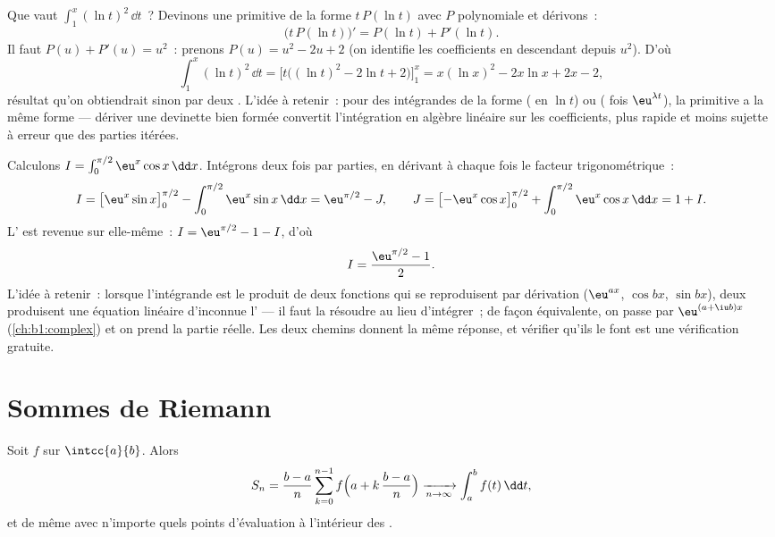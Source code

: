 \begin{example}\label{ex:b1:integration:guessdiff}
Que vaut $\int_1^x (\ln t)^2\,\dd t$~? Devinons une primitive de
la forme $t\,P(\ln t)$ avec $P$ polynomiale et dérivons~:
\[
\bigl(t\,P(\ln t)\bigr)' = P(\ln t) + P'(\ln t) .
\]
Il faut $P(u) + P'(u) = u^2$~: prenons $P(u) = u^2 - 2u + 2$ (on
identifie les coefficients en descendant depuis $u^2$). D'où
\[
\int_1^x (\ln t)^2\,\dd t
= \bigl[t\bigl((\ln t)^2 - 2\ln t + 2\bigr)\bigr]_1^x
= x(\ln x)^2 - 2x\ln x + 2x - 2 ,
\]
résultat qu'on obtiendrait sinon par deux . L'idée à retenir~: pour des intégrandes de la forme
( en $\ln t$) ou ( fois $\eu^{\lambda t}$), la
primitive a la même forme --- dériver une devinette bien formée
convertit l'intégration en algèbre linéaire sur les coefficients,
plus rapide et moins sujette à erreur que des parties itérées.
\end{example}

\begin{example}\label{ex:b1:integration:boomerang}
Calculons $I = \int_0^{\pi/2} \eu^x \cos x\,\dd x$. Intégrons deux
fois par parties, en dérivant à chaque fois le facteur
trigonométrique~:
\[
I = \bigl[\eu^x \sin x\bigr]_0^{\pi/2}
- \int_0^{\pi/2} \eu^x \sin x\,\dd x
= \eu^{\pi/2} - J,
\qquad
J = \bigl[-\eu^x\cos x\bigr]_0^{\pi/2}
+ \int_0^{\pi/2} \eu^x\cos x\,\dd x = 1 + I .
\]
L' est revenue sur elle-même~: $I = \eu^{\pi/2} - 1 - I$,
d'où
\[
I = \frac{\eu^{\pi/2} - 1}{2} .
\]
L'idée à retenir~: lorsque l'intégrande est le produit de deux
fonctions qui se reproduisent par dérivation ($\eu^{ax}$, $\cos
bx$, $\sin bx$), deux  produisent une
équation linéaire d'inconnue l' --- il faut la résoudre
au lieu d'intégrer~; de façon équivalente, on passe par
$\eu^{(a + \iu b)x}$ (\cref{ch:b1:complex}) et on prend la partie
réelle. Les deux chemins donnent la même réponse, et vérifier
qu'ils le font est une vérification gratuite.
\end{example}

\section{Sommes de Riemann}

\begin{theorem}\label{thm:b1:integration:riemann}
Soit $f$  sur $\intcc{a}{b}$. Alors
\[
S_n = \frac{b - a}{n} \sum_{k=0}^{n-1}
f\Bigl(a + k\,\frac{b-a}{n}\Bigr)
\xrightarrow[n \to \infty]{} \int_a^b f(t)\, \dd t ,
\]
et de même avec n'importe quels points d'évaluation à l'intérieur des
.
\end{theorem}

